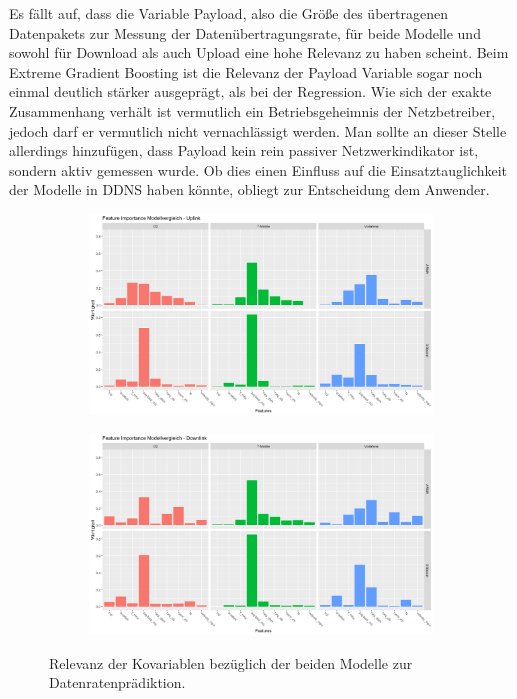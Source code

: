Es f\"allt auf, dass die Variable Payload, also die Gr\"o{\ss}e des \"ubertragenen Datenpakets zur Messung der Daten\"ubertragungsrate,
f\"ur beide Modelle und sowohl f\"ur Download als auch Upload eine hohe Relevanz zu haben scheint.
Beim Extreme Gradient Boosting ist die Relevanz der Payload Variable sogar noch einmal deutlich st\"arker ausgepr\"agt, als bei
der Regression.
Wie sich der exakte Zusammenhang verh\"alt ist vermutlich ein Betriebsgeheimnis der Netzbetreiber, jedoch darf er vermutlich nicht
vernachl\"assigt werden.
Man sollte an dieser Stelle allerdings hinzuf\"ugen, dass Payload kein rein passiver Netzwerkindikator ist, sondern aktiv gemessen wurde.
Ob dies einen Einfluss auf die Einsatztauglichkeit der Modelle in DDNS haben k\"onnte, obliegt zur Entscheidung dem Anwender.
\begin{figure}
\centering
\begin{subfigure}{\textwidth}
    \centering
    \includegraphics[width=\textwidth]{abbildungen/feature_importance_modellvergleich_uplink}
\end{subfigure}
\begin{subfigure}{\textwidth}
    \centering
    \includegraphics[width=\textwidth]{abbildungen/feature_importance_modellvergleich_downlink}
\end{subfigure}
\caption{Relevanz der Kovariablen bez\"uglich der beiden Modelle zur Datenratenpr\"adiktion.}
\label{fig:feature-importance-datenraten}
\end{figure}

